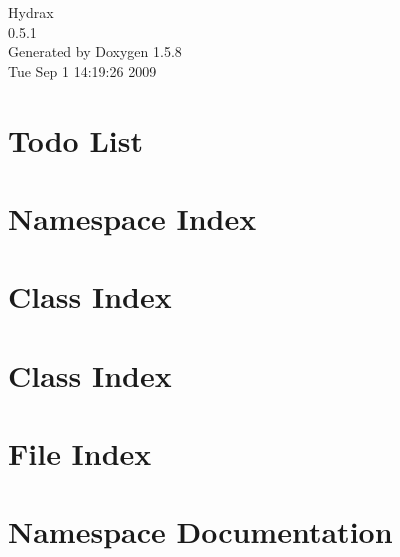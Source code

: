 \documentclass[a4paper]{book}
\begin{document}
\begin{titlepage}
\vspace*{7cm}
\begin{center}
{\Large Hydrax \\[1ex]\large 0.5.1 }\\
\vspace*{1cm}
{\large Generated by Doxygen 1.5.8}\\
\vspace*{0.5cm}
{\small Tue Sep 1 14:19:26 2009}\\
\end{center}
\end{titlepage}
\clearemptydoublepage
{}
\tableofcontents
\clearemptydoublepage
{}
\chapter{Todo List}
\label{todo}
\hypertarget{todo}{}

\chapter{Namespace Index}

\chapter{Class Index}

\chapter{Class Index}

\chapter{File Index}

\chapter{Namespace Documentation}



\end{document}
